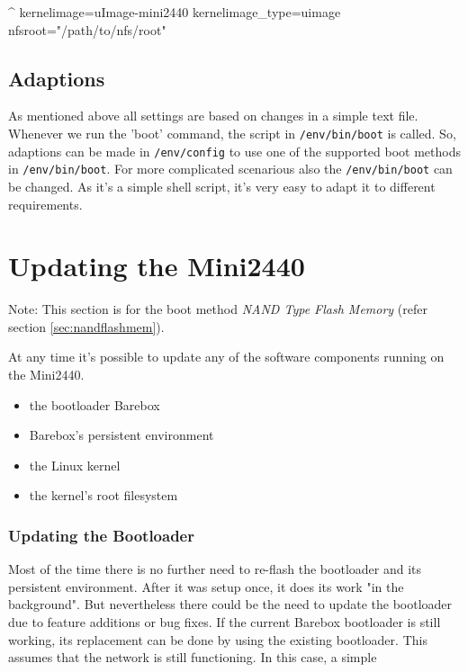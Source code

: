 \begin{ptxshell}[escapechar=|]{^}
kernelimage=uImage-mini2440
kernelimage_type=uimage
nfsroot="/path/to/nfs/root"
\end{ptxshell}

\subsection{Adaptions}

As mentioned above all settings are based on changes in a simple text file.
Whenever we run the 'boot' command, the script in \texttt{/env/bin/boot} is
called. So, adaptions can be made in \texttt{/env/config} to use one of the
supported boot methods in \texttt{/env/bin/boot}. For more complicated
scenarious also the \texttt{/env/bin/boot} can be changed. As it's a simple
shell script, it's very easy to adapt it to different requirements.


\section{Updating the Mini2440}	\label{sec:updating}

Note: This section is for the boot method \textit{NAND Type Flash Memory}
(refer section \ref{sec:nandflashmem}).

At any time it's possible to update any of the software components
running on the Mini2440.

\begin{itemize}
	\item the bootloader Barebox
	\item Barebox's persistent environment
	\item the Linux kernel
	\item the kernel's root filesystem
\end{itemize}

\subsubsection{Updating the Bootloader}

Most of the time there is no further need to re-flash the bootloader and its
persistent environment. After it was setup once, it does its work "in the
background". But nevertheless there could be the need to update the bootloader
due to feature additions or bug fixes. If the current Barebox bootloader is
still working, its replacement can be done by using the existing bootloader.
This assumes that the network is still functioning. In this case, a simple

